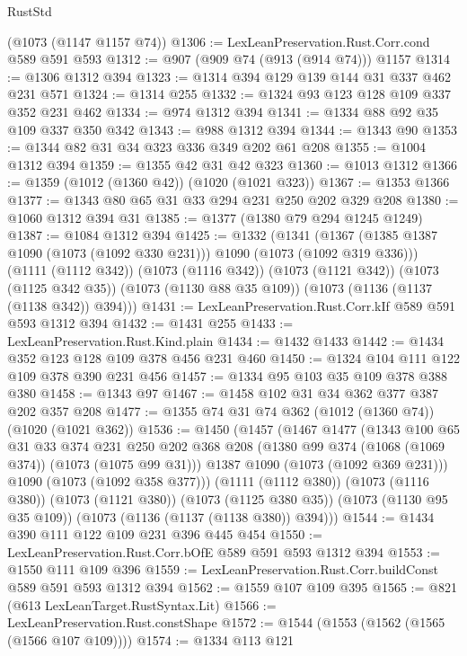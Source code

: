 \begin{lexlean}{RustStd}
\begin{coremodule}
    (@1073 (@1147 @1157 @74))
@1306 := LexLeanPreservation.Rust.Corr.cond @589 @591 @593
@1312 := @907 (@909 @74 (@913 (@914 @74))) @1157
@1314 := @1306 @1312 @394
@1323 := @1314 @394 @129 @139 @144 @31 @337 @462 @231 @571
@1324 := @1314 @255
@1332 := @1324 @93 @123 @128 @109 @337 @352 @231 @462
@1334 := @974 @1312 @394
@1341 := @1334 @88 @92 @35 @109 @337 @350 @342
@1343 := @988 @1312 @394
@1344 := @1343 @90
@1353 := @1344 @82 @31 @34 @323 @336 @349 @202 @61 @208
@1355 := @1004 @1312 @394
@1359 := @1355 @42 @31 @42 @323
@1360 := @1013 @1312
@1366 := @1359 (@1012 (@1360 @42)) (@1020 (@1021 @323))
@1367 := @1353 @1366
@1377 := @1343 @80 @65 @31 @33 @294 @231 @250 @202 @329 @208
@1380 := @1060 @1312 @394 @31
@1385 := @1377 (@1380 @79 @294 @1245 @1249)
@1387 := @1084 @1312 @394
@1425 := @1332
    (@1341
      (@1367 (@1385 @1387 @1090 (@1073 (@1092 @330 @231))) @1090 (@1073 (@1092 @319 @336)))
      (@1111 (@1112 @342))
      (@1073 (@1116 @342))
      (@1073 (@1121 @342))
      (@1073 (@1125 @342 @35))
      (@1073 (@1130 @88 @35 @109))
      (@1073 (@1136 (@1137 (@1138 @342)) @394)))
@1431 := LexLeanPreservation.Rust.Corr.kIf @589 @591 @593 @1312 @394
@1432 := @1431 @255
@1433 := LexLeanPreservation.Rust.Kind.plain
@1434 := @1432 @1433
@1442 := @1434 @352 @123 @128 @109 @378 @456 @231 @460
@1450 := @1324 @104 @111 @122 @109 @378 @390 @231 @456
@1457 := @1334 @95 @103 @35 @109 @378 @388 @380
@1458 := @1343 @97
@1467 := @1458 @102 @31 @34 @362 @377 @387 @202 @357 @208
@1477 := @1355 @74 @31 @74 @362 (@1012 (@1360 @74)) (@1020 (@1021 @362))
@1536 := @1450
    (@1457
      (@1467
        @1477
        (@1343
          @100
          @65
          @31
          @33
          @374
          @231
          @250
          @202
          @368
          @208
          (@1380 @99 @374 (@1068 (@1069 @374)) (@1073 (@1075 @99 @31)))
          @1387
          @1090
          (@1073 (@1092 @369 @231)))
        @1090
        (@1073 (@1092 @358 @377)))
      (@1111 (@1112 @380))
      (@1073 (@1116 @380))
      (@1073 (@1121 @380))
      (@1073 (@1125 @380 @35))
      (@1073 (@1130 @95 @35 @109))
      (@1073 (@1136 (@1137 (@1138 @380)) @394)))
@1544 := @1434 @390 @111 @122 @109 @231 @396 @445 @454
@1550 := LexLeanPreservation.Rust.Corr.bOfE @589 @591 @593 @1312 @394
@1553 := @1550 @111 @109 @396
@1559 := LexLeanPreservation.Rust.Corr.buildConst @589 @591 @593 @1312 @394
@1562 := @1559 @107 @109 @395
@1565 := @821 (@613 LexLeanTarget.RustSyntax.Lit)
@1566 := LexLeanPreservation.Rust.constShape
@1572 := @1544 (@1553 (@1562 (@1565 (@1566 @107 @109))))
@1574 := @1334 @113 @121

\end{coremodule}
\end{lexlean}
